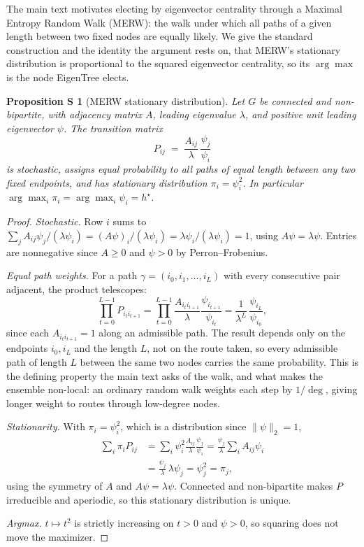 \documentclass[letterpaper]{article} %
\newtheorem{sproposition}{Proposition S}
\begin{document}
The main text motivates electing by eigenvector centrality through a Maximal
Entropy Random Walk (MERW): the walk under which all paths of a given length
between two fixed nodes are equally likely. We give the standard construction
\citep{burda2009localization} and the identity the argument rests on, that
MERW's stationary distribution is proportional to the squared eigenvector
centrality, so its $\arg\max$ is the node EigenTree elects.

\begin{sproposition}[MERW stationary distribution]
\label{prop:merw}
Let $G$ be connected and non-bipartite, with adjacency matrix $A$, leading
eigenvalue $\lambda$, and positive unit leading eigenvector $\psi$. The
transition matrix
\[
P_{ij} \;=\; \frac{A_{ij}}{\lambda}\,\frac{\psi_j}{\psi_i}
\]
is stochastic, assigns equal probability to all paths of equal length between
any two fixed endpoints, and has stationary distribution $\pi_i = \psi_i^2$. In
particular $\arg\max_i \pi_i = \arg\max_i \psi_i = h^\star$.
\end{sproposition}

\begin{proof}
\emph{Stochastic.} Row $i$ sums to $\sum_j A_{ij}\psi_j/(\lambda\psi_i) =
(A\psi)_i/(\lambda\psi_i) = \lambda\psi_i/(\lambda\psi_i) = 1$, using
$A\psi=\lambda\psi$. Entries are nonnegative since $A\geq 0$ and $\psi>0$ by
Perron--Frobenius.

\emph{Equal path weights.} For a path $\gamma = (i_0, i_1, \ldots, i_L)$ with
every consecutive pair adjacent, the product telescopes:
\[
\prod_{t=0}^{L-1} P_{i_t i_{t+1}}
= \prod_{t=0}^{L-1} \frac{A_{i_t i_{t+1}}}{\lambda}\frac{\psi_{i_{t+1}}}{\psi_{i_t}}
= \frac{1}{\lambda^{L}}\,\frac{\psi_{i_L}}{\psi_{i_0}},
\]
since each $A_{i_t i_{t+1}}=1$ along an admissible path. The result depends only
on the endpoints $i_0, i_L$ and the length $L$, not on the route taken, so every
admissible path of length $L$ between the same two nodes carries the same
probability. This is the defining property the main text asks of the walk, and
what makes the ensemble non-local: an ordinary random walk weights each step
by $1/\deg$, giving longer weight to routes through low-degree nodes.

\emph{Stationarity.} With $\pi_i = \psi_i^2$, which is a distribution since
$\|\psi\|_2=1$,
\begin{align*}
\sum_i \pi_i P_{ij}
&= \sum_i \psi_i^2 \frac{A_{ij}}{\lambda}\frac{\psi_j}{\psi_i}
 = \frac{\psi_j}{\lambda}\sum_i A_{ij}\psi_i \\
&= \frac{\psi_j}{\lambda}\,\lambda\psi_j
 = \psi_j^2 = \pi_j,
\end{align*}
using the symmetry of $A$ and $A\psi=\lambda\psi$. Connected and non-bipartite
makes $P$ irreducible and aperiodic, so this stationary distribution is unique.

\emph{Argmax.} $t\mapsto t^2$ is strictly increasing on $t>0$ and $\psi>0$, so
squaring does not move the maximizer.
\end{proof}
\end{document}

